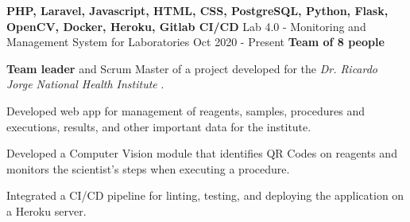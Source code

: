   \cventry
    {\textbf{PHP, Laravel, Javascript, HTML, CSS, PostgreSQL, Python, Flask, OpenCV, Docker, Heroku, Gitlab CI/CD}} %
    {Lab 4.0 - Monitoring and Management System for Laboratories \href{https://laboratorio-4.herokuapp.com/}{\faExternalLink}} %
    {Oct 2020 - Present} %
    {\textbf{Team of 8 people}} %
    {
      \begin{cvitems} %
        \item {\textbf{Team leader} and Scrum Master of a project developed for the \textit{Dr. Ricardo Jorge National Health Institute} \href{http://www.insa.pt}{\faExternalLink}.}
        \item {Developed web app for management of reagents, samples, procedures and executions, results, and other important data for the institute.}
        \item {Developed a Computer Vision module that identifies QR Codes on reagents and monitors the scientist's steps when executing a procedure.}
        \item {Integrated a CI/CD pipeline for linting, testing, and deploying the application on a Heroku server.}
      \end{cvitems}
    }